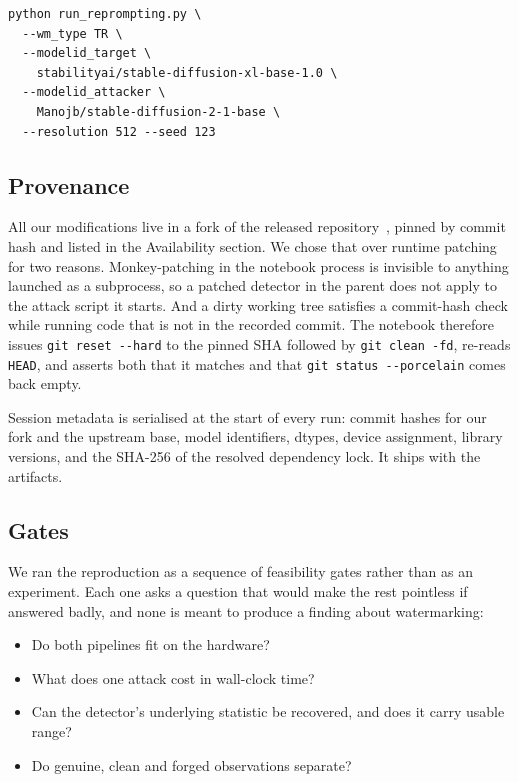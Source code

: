 \documentclass[10pt,twocolumn]{article}
\newcommand{\code}[1]{\texttt{\small #1}}
\begin{document}
\begin{lstlisting}[style=sh,caption={The released Reprompt entry point, exactly
as our notebook invokes it. Everything else in this paper is reproduction and
instrumentation work built around this one command.},label=lst:cli]
python run_reprompting.py \
  --wm_type TR \
  --modelid_target \
    stabilityai/stable-diffusion-xl-base-1.0 \
  --modelid_attacker \
    Manojb/stable-diffusion-2-1-base \
  --resolution 512 --seed 123
\end{lstlisting}

\subsection{Provenance}

All our modifications live in a fork of the released
repository~\cite{semanticforgery-repo}, pinned by commit hash and listed in the
Availability section. We chose that over
runtime patching for two reasons. Monkey-patching in the notebook process is invisible
to anything launched as a subprocess, so a patched detector in the parent does not
apply to the attack script it starts. And a dirty working tree satisfies a commit-hash
check while running code that is not in the recorded commit. The notebook therefore
issues \code{git reset -{}-hard} to the pinned SHA followed by \code{git clean -fd},
re-reads \code{HEAD}, and asserts both that it matches and that
\code{git status -{}-porcelain} comes back empty.

Session metadata is serialised at the start of every run: commit hashes for our fork
and the upstream base, model identifiers, dtypes, device assignment, library versions,
and the SHA-256 of the resolved dependency lock. It ships with the artifacts.

\subsection{Gates}

We ran the reproduction as a sequence of feasibility gates rather than as an
experiment. Each one asks a question that would make the rest pointless if answered
badly, and none is meant to produce a finding about watermarking:

\begin{itemize}\itemsep2pt
\item[\textbf{G1}] Do both pipelines fit on the hardware?
\item[\textbf{G2}] What does one attack cost in wall-clock time?
\item[\textbf{G3}] Can the detector's underlying statistic be recovered, and does it
      carry usable range?
\item[\textbf{G4}] Do genuine, clean and forged observations separate?
\end{itemize}
\end{document}
